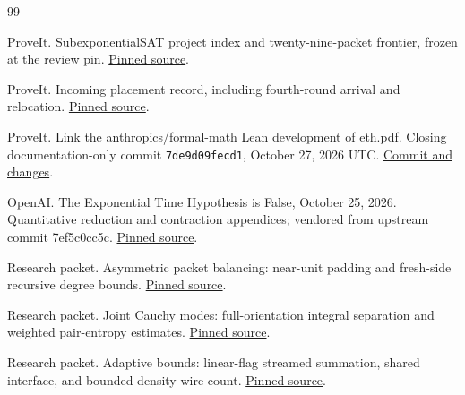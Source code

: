 \clearpage\begingroup\small
\begin{thebibliography}{99}

 ProveIt. SubexponentialSAT project index and twenty-nine-packet frontier, frozen at the review pin. \href{https://github.com/VladimirReshetnikov/ProveIt/blob/a7ae5ab55f9627f5af7bf77443b3c34ef8ef1be4/Computability/SubexponentialSAT/README.md}{Pinned source}.

 ProveIt. Incoming placement record, including fourth-round arrival and relocation. \href{https://github.com/VladimirReshetnikov/ProveIt/blob/a7ae5ab55f9627f5af7bf77443b3c34ef8ef1be4/docs/incoming/README.md}{Pinned source}.

 ProveIt. Link the anthropics/formal-math Lean development of eth.pdf. Closing documentation-only commit \texttt{7de9d09fecd1}, October 27, 2026 UTC. \href{https://github.com/VladimirReshetnikov/ProveIt/commit/7de9d09fecd17de776d712835ecb2011205c531d}{Commit and changes}.

 OpenAI. The Exponential Time Hypothesis is False, October 25, 2026. Quantitative reduction and contraction appendices; vendored from upstream commit 7ef5c0cc5c. \href{https://github.com/VladimirReshetnikov/ProveIt/blob/a7ae5ab55f9627f5af7bf77443b3c34ef8ef1be4/lib/openai-math/preprints/The-Exponential-Time-Hypothesis-is-False-October-25-2026/build/quantitative-contraction.tex}{Pinned source}.

 Research packet. Asymmetric packet balancing: near-unit padding and fresh-side recursive degree bounds. \href{https://github.com/VladimirReshetnikov/ProveIt/blob/a7ae5ab55f9627f5af7bf77443b3c34ef8ef1be4/Computability/SubexponentialSAT/Research/eth_asymmetric_packet_balancing/report.tex}{Pinned source}.

 Research packet. Joint Cauchy modes: full-orientation integral separation and weighted pair-entropy estimates. \href{https://github.com/VladimirReshetnikov/ProveIt/blob/a7ae5ab55f9627f5af7bf77443b3c34ef8ef1be4/Computability/SubexponentialSAT/Research/eth_joint_cauchy/report.tex}{Pinned source}.

 Research packet. Adaptive bounds: linear-flag streamed summation, shared interface, and bounded-density wire count. \href{https://github.com/VladimirReshetnikov/ProveIt/blob/a7ae5ab55f9627f5af7bf77443b3c34ef8ef1be4/Computability/SubexponentialSAT/Research/sat_adaptive_bounds/report/report.tex}{Pinned source}.


\end{thebibliography}
